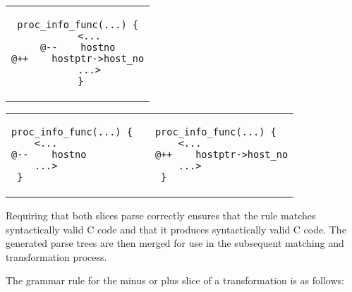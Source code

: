 \documentclass{article}
\newcommand{\sizecodebis}[0]{\scriptsize}
\begin{document}
\begin{center}
\begin{tabular}{c}
\begin{lstlisting}[language=Cocci]
  proc_info_func(...) {
    <...
@--    hostno
@++    hostptr->host_no
    ...>
 }
\end{lstlisting}\\
\end{tabular}
\end{center}

{%
\begin{center}
\begin{tabular}{p{5cm}p{3cm}p{5cm}}
\begin{lstlisting}[language=Cocci]
  proc_info_func(...) {
    <...
@--    hostno
    ...>
 }
\end{lstlisting}
&&
\begin{lstlisting}[language=Cocci]
  proc_info_func(...) {
    <...
@++    hostptr->host_no
    ...>
 }
\end{lstlisting}
\end{tabular}
\end{center}
}

\noindent
Requiring that both slices parse correctly ensures that the rule matches
syntactically valid C code and that it produces syntactically valid C code.
The generated parse trees are then merged for use in the subsequent
matching and transformation process.

The grammar rule for the minus or plus slice of a transformation is as follows:
\end{document}
